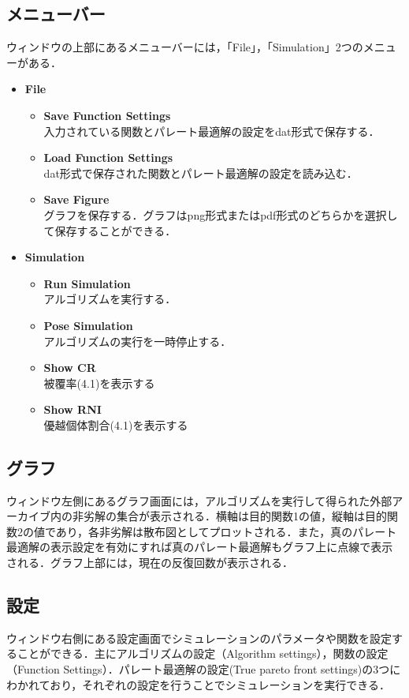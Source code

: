 \documentclass[a4paper, twocolumn]{ltjsarticle}
\begin{document}
\subsection{メニューバー}
ウィンドウの上部にあるメニューバーには，「File」，「Simulation」2つのメニューがある．
\begin{itemize}
    \item \textbf{File}
        \begin{itemize}
            \item \textbf{Save Function Settings}\\
            入力されている関数とパレート最適解の設定をdat形式で保存する．
            \item \textbf{Load Function Settings}\\ 
            dat形式で保存された関数とパレート最適解の設定を読み込む．
            \item \textbf{Save Figure}\\
            グラフを保存する．グラフはpng形式またはpdf形式のどちらかを選択して保存することができる．
        \end{itemize}
    \item \textbf{Simulation}
        \begin{itemize}
            \item \textbf{Run Simulation}\\
            アルゴリズムを実行する．
            \item \textbf{Pose Simulation}\\
            アルゴリズムの実行を一時停止する．
            \item \textbf{Show CR}\\
            被覆率(4.1)を表示する
            \item \textbf{Show RNI}\\
            優越個体割合(4.1)を表示する
        \end{itemize}
\end{itemize}
\subsection{グラフ}
ウィンドウ左側にあるグラフ画面には，アルゴリズムを実行して得られた外部アーカイブ内の非劣解の集合が表示される．横軸は目的関数1の値，縦軸は目的関数2の値であり，各非劣解は散布図としてプロットされる．また，真のパレート最適解の表示設定を有効にすれば真のパレート最適解もグラフ上に点線で表示される．グラフ上部には，現在の反復回数が表示される．
\subsection{設定}
ウィンドウ右側にある設定画面でシミュレーションのパラメータや関数を設定することができる．主にアルゴリズムの設定（Algorithm settings），関数の設定（Function Settings）．パレート最適解の設定(True pareto front settings)の3つにわかれており，それぞれの設定を行うことでシミュレーションを実行できる．
\end{document}
